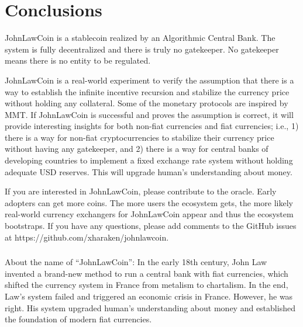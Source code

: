 \documentclass[dvipdfmx,a4paper]{article}
\begin{document}
\section{Conclusions}

JohnLawCoin is a stablecoin realized by an Algorithmic Central Bank. The system is fully decentralized and there is truly no gatekeeper. No gatekeeper means there is no entity to be regulated.

JohnLawCoin is a real-world experiment to verify the assumption that there is a way to establish the infinite incentive recursion and stabilize the currency price without holding any collateral. Some of the monetary protocols are inspired by MMT. If JohnLawCoin is successful and proves the assumption is correct, it will provide interesting insights for both non-fiat currencies and fiat currencies; i.e., 1) there is a way for non-fiat cryptocurrencies to stabilize their currency price without having any gatekeeper, and 2) there is a way for central banks of developing countries to implement a fixed exchange rate system without holding adequate USD reserves. This will upgrade human's understanding about money.

If you are interested in JohnLawCoin, please contribute to the oracle. Early adopters can get more coins. The more users the ecosystem gets, the more likely real-world currency exchangers for JohnLawCoin appear and thus the ecosystem bootstraps. If you have any questions, please add comments to the GitHub issues at https://github.com/xharaken/johnlawcoin.

\subsubsection*{}

About the name of ``JohnLawCoin'': In the early 18th century, John Law~\cite{davies2010history,ferguson2008ascent,iwai1997evolution} invented a brand-new method to run a central bank with fiat currencies, which shifted the currency system in France from metalism to chartalism. In the end, Law's system failed and triggered an economic crisis in France. However, he was right. His system upgraded human's understanding about money and established the foundation of modern fiat currencies.



\end{document}
